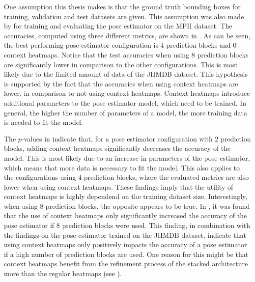 One assumption this thesis makes is that the ground truth bounding boxes for training, validation and test datasets are given.
This assumption was also made by \cite{luvizon_2d/3d_2018} for training and evaluating the pose estimator on the MPII dataset.
The accuracies, computed using three different metrics, are shown in .
As can be seen, the best performing pose estimator configuration is $4$ prediction blocks and $0$ context heatmaps.
Notice that the test accuracies when using $8$ prediction blocks are significantly lower in comparison to the other configurations.
This is most likely due to the limited amount of data of the JHMDB dataset.
This hypothesis is supported by the fact that the accuracies when using context heatmaps are lower, in comparison to not using context heatmaps.
Context heatmaps introduce additional parameters to the pose estimator model, which need to be trained.
In general, the higher the number of parameters of a model, the more training data is needed to fit the model.

The $p$-values in  indicate that, for a pose estimator configuration with $2$ prediction blocks, adding context heatmaps significantly decreases the accuracy of the model.
This is most likely due to an increase in parameters of the pose estimator, which means that more data is necessary to fit the model.
This also applies to the configurations using $4$ prediction blocks, where the evaluated metrics are also lower when using context heatmaps.
These findings imply that the utility of context heatmaps is highly dependend on the training dataset size.
Interestingly, when using $8$ prediction blocks, the opposite appears to be true.
In , it was found that the use of context heatmaps only significantly increased the accuracy of the pose estimator if $8$ prediction blocks were used.
This finding, in combination with the findings on the pose estimator trained on the JHMDB dataset, indicate that using context heatmaps only positively impacts the accuracy of a pose estimator if a high number of prediction blocks are used.
One reason for this might be that context heatmaps benefit from the refinement process of the stacked architecture more than the regular heatmaps (see ).  

